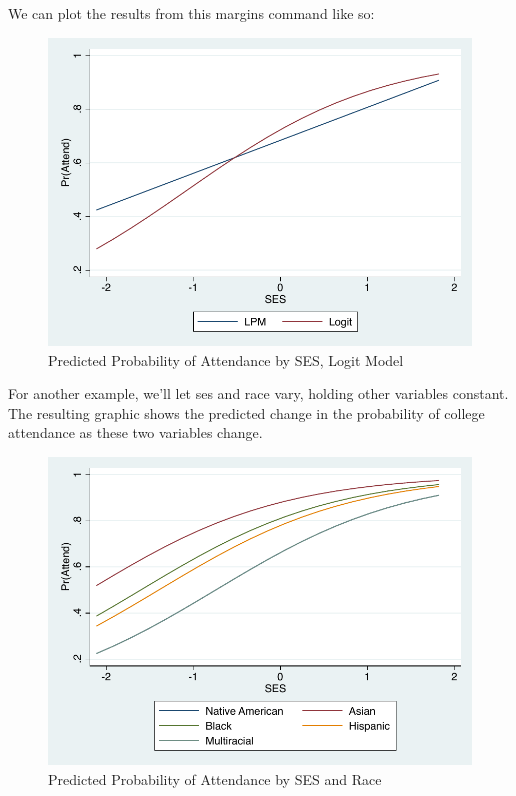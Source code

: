 \documentclass[12pt]{article}
\begin{document}
We can plot the results from this margins command like so: 



\begin{figure}[h]
  \centering
  \includegraphics[width=\textwidth]{logit_basic}
  \caption{Predicted Probability of Attendance by SES, Logit Model}
\end{figure}


For another example, we'll let ses and race vary, holding other
variables constant. The resulting graphic shows the predicted change
in the probability of college attendance as these two variables
change. 


\begin{figure}[h]
  \centering
  \includegraphics[width=\textwidth]{logit_race}
  \caption{Predicted Probability of Attendance by SES and Race}
\end{figure}
\end{document}
